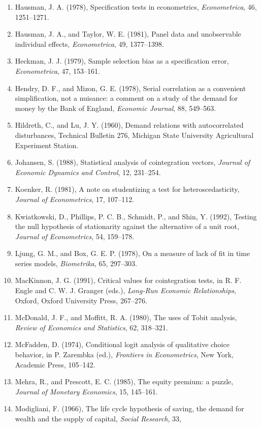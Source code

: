 \documentclass[11pt,a4paper]{article}
\numberwithin{equation}{section}
\theoremstyle{definition}
\begin{document}
\begin{enumerate}
\item Hausman, J. A. (1978), Specification tests in econometrics, \emph{Econometrica}, 46, 1251--1271.
\item Hausman, J. A., and Taylor, W. E. (1981), Panel data and unobservable individual effects, \emph{Econometrica}, 49, 1377--1398.
\item Heckman, J. J. (1979), Sample selection bias as a specification error, \emph{Econometrica}, 47, 153--161.
\item Hendry, D. F., and Mizon, G. E. (1978), Serial correlation as a convenient simplification, not a nuisance: a comment on a study of the demand
for money by the Bank of England, \emph{Economic Journal}, 88, 549--563.
\item Hildreth, C., and Lu, J. Y. (1960), Demand relations with autocorrelated disturbances, Technical Bulletin 276, Michigan State University
Agricultural Experiment Station.
\item Johansen, S. (1988), Statistical analysis of cointegration vectors, \emph{Journal of Economic Dynamics and Control}, 12, 231--254.
\item Koenker, R. (1981), A note on studentizing a test for heteroscedasticity, \emph{Journal of Econometrics}, 17, 107--112.
\item Kwiatkowski, D., Phillips, P. C. B., Schmidt, P., and Shin, Y. (1992), Testing the null hypothesis of stationarity against the alternative of
a unit root, \emph{Journal of Econometrics}, 54, 159--178.
\item Ljung, G. M., and Box, G. E. P. (1978), On a measure of lack of fit in time series models, \emph{Biometrika}, 65, 297--303.
\item MacKinnon, J. G. (1991), Critical values for cointegration tests, in R. F. Engle and C. W. J. Granger (eds.), \emph{Long-Run Economic
Relationships}, Oxford, Oxford University Press, 267--276.
\item McDonald, J. F., and Moffitt, R. A. (1980), The uses of Tobit analysis, \emph{Review of Economics and Statistics}, 62, 318--321.
\item McFadden, D. (1974), Conditional logit analysis of qualitative choice behavior, in P. Zarembka (ed.), \emph{Frontiers in Econometrics}, New
York, Academic Press, 105--142.
\item Mehra, R., and Prescott, E. C. (1985), The equity premium: a puzzle, \emph{Journal of Monetary Economics}, 15, 145--161.
\item Modigliani, F. (1966), The life cycle hypothesis of saving, the demand for wealth and the supply of capital, \emph{Social Research}, 33,

\end{enumerate}
\end{document}
